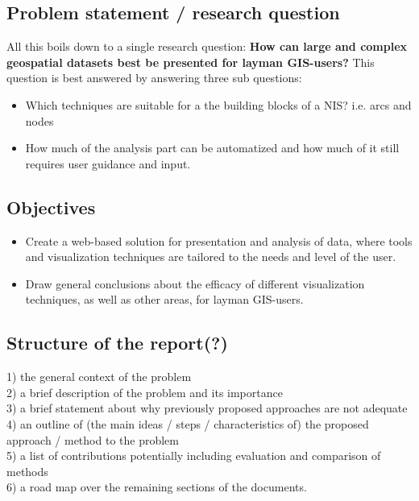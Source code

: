 \documentclass[a4paper,12pt,titlepage]{article}
\begin{document}
\subsection{Problem statement / research question}

All this boils down to a single research question: \textbf{ How can large and complex geospatial datasets best be presented for layman GIS-users?} This question is best answered by answering three sub questions:

\begin{itemize}
  \item Which techniques are suitable for a the building blocks of a NIS?  i.e. arcs and nodes
  \item How much of the analysis part can be automatized and how much of it still requires user guidance and input.
\end{itemize}

\subsection{Objectives}

\begin{itemize}
  \item Create a web-based solution for presentation and analysis of data, where tools and visualization techniques are tailored to the needs and level of the user.
  \item Draw general conclusions about the efficacy of different visualization techniques, as well as other areas, for layman GIS-users.
\end{itemize}


\subsection{Structure of the report(?)}

1) the general context of the problem \\ 
2) a brief description of the problem and its importance \\
3) a brief statement about why previously proposed approaches are not adequate \\
4) an outline of (the main ideas / steps / characteristics of) the proposed approach / method to the problem \\
5) a list of contributions potentially including evaluation and comparison of methods \\
6) a road map over the remaining sections of the documents. \\
\end{document}
